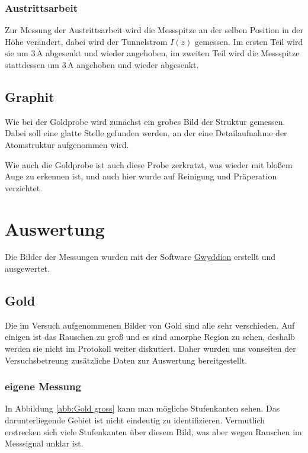 \documentclass[12pt,a4paper]{scrartcl}
\numberwithin{equation}{section} %
\begin{document}
\hypertarget{austrittsarbeit}{%
\subsubsection{Austrittsarbeit}\label{austrittsarbeit}}

Zur Messung der Austrittsarbeit wird die Messspitze an der selben Position in der Höhe verändert, dabei wird der Tunnelstrom $I(z)$ gemessen. Im ersten Teil wird sie um $3\,\mathrm{\mathring{A}}$ abgesenkt und wieder angehoben, im zweiten Teil wird die Messspitze stattdessen um $3\,\mathrm{\mathring{A}}$ angehoben und wieder abgesenkt.

\hypertarget{graphit}{%
\subsection{Graphit}\label{graphit}}

Wie bei der Goldprobe wird zunächst ein grobes Bild der Struktur gemessen. Dabei soll eine glatte Stelle gefunden werden, an der eine Detailaufnahme der Atomstruktur aufgenommen wird.

Wie auch die Goldprobe ist auch diese Probe zerkratzt, was wieder mit bloßem Auge zu erkennen ist, und auch hier wurde auf Reinigung und Präperation verzichtet.

\clearpage
\hypertarget{auswertung}{%
\section{Auswertung}\label{auswertung}}
Die Bilder der Messungen wurden mit der Software \href{http://gwyddion.net}{Gwyddion} \cite{Gwyddion} erstellt und ausgewertet.

\hypertarget{gold-1}{%
\subsection{Gold}\label{gold-1}}

Die im Versuch aufgenommenen Bilder von Gold sind alle sehr verschieden. Auf einigen ist das Rauschen zu groß und es sind amorphe Region zu sehen, deshalb werden sie nicht im Protokoll weiter diskutiert. Daher wurden uns vonseiten der Versuchsbetreung zusätzliche Daten zur Auswertung bereitgestellt. \cite{Grover}

\hypertarget{eigene-messung}{%
\subsubsection{eigene Messung}\label{eigene-messung}}
In Abbildung \ref{abb:Gold gross} kann man mögliche Stufenkanten sehen. Das darunterliegende Gebiet ist nicht eindeutig zu identifizieren. Vermutlich erstrecken sich viele Stufenkanten über diesem Bild, was aber wegen Rauschen im Messsignal unklar ist.
\end{document}
